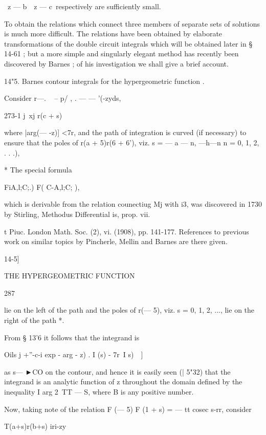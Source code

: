 \ z — b\, \ z — c\ respectively are sufficiently small. 



To obtain the relations which connect three members of separate sets 
of solutions is much more difficult. The relations have been obtained by 
elaborate transformations of the double circuit integrals which will be obtained 
later in § 14-61 ; but a more simple and singularly elegant method has recently 
been discovered by Barnes ; of his investigation we shall give a brief account. 

14"5. Barnes contour integrals for the hypergeometric function . 

Consider  r—. ~ -- p/ , . — — '(-zyds, 

273-1 j\ xj r(c + s) 

where |arg(— -z)] <7r, and the path of integration is curved (if necessary) to 
ensure that the poles of r(a + 5)r(6 + 6'), viz. s = — a — n, —h—n  n = 0, 1, 2, . . .), 

* The special formula 

FiA,l;C;.)  F( C-A,l;C; ), 

which is derivable from the relation counectiug Mj with  i3, was discovered in 1730 by Stirling, 
Methodus Differential is, prop. vii. 

t Piuc. London Math. Soc. (2), vi. (1908), pp. 141-177. References to previous work on similar 
topics by Pincherle, Mellin and Barnes are there given. 



14-5] 



THE HYPERGEOMETRIC FUNCTION 



287 



lie on the left of the path and the poles of r(— 5), viz. s = 0, 1, 2, ..., lie on 
the right of the path *. 

From § 13'6 it follows that the integrand is 

Oils j +''-c-i exp  - arg  - z) . I (s) - 7r\ I  s)\ \ ] 

as s— ►CO on the contour, and hence it is easily seen (| 5"32) that the integrand 
is an analytic function of z throughout the domain defined by the inequality 
I arg 2\  TT — S, where B is any positive number. 

Now, taking note of the relation F (— 5) F (1 + s) = — tt cosec s-rr, consider 

T(a+s)r(b+s) iri-zy 



